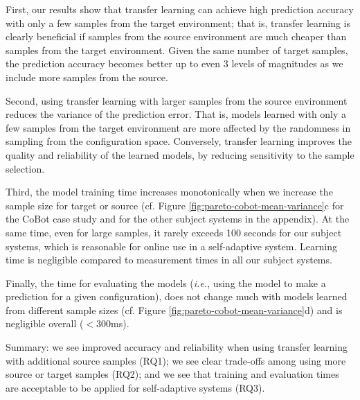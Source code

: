 
First, our results show that transfer learning can achieve high prediction accuracy with only a few samples from the target environment;
that is, transfer learning is clearly beneficial if samples from the source environment are much cheaper than samples from the target environment.
Given the same number of target samples, the prediction accuracy becomes better up to even 3 levels of magnitudes as we include more samples from the source.

Second, using transfer learning with larger samples from the source environment reduces  the variance of the prediction error. That is, models learned with only a few samples from the target environment are more affected by the randomness in sampling from the configuration space. Conversely, transfer learning improves the quality and
reliability of the learned models, by reducing sensitivity to the sample selection.

Third, the model training time increases monotonically when we increase the sample size for target or source (cf. Figure \ref{fig:pareto-cobot-mean-variance}c for the CoBot case study and for the other subject systems in the appendix). At the same time,
even for large samples, it rarely exceeds 100 seconds for our subject systems, which is reasonable for online use in a self-adaptive system. Learning time is negligible compared to measurement times in all our subject systems.

Finally, the time for evaluating the models (\emph{i.e.}, using
the model to make a prediction for a given configuration), does not change
much with models learned from different sample sizes (cf. Figure \ref{fig:pareto-cobot-mean-variance}d) and is negligible overall ($<300$ms).

\begin{shaded}
Summary: we see improved accuracy and reliability
when using transfer learning with additional source samples (RQ1); we
see clear trade-offs among using more source or target samples (RQ2);
and we see that training and evaluation times are acceptable to be applied for self-adaptive systems (RQ3).
\end{shaded}


